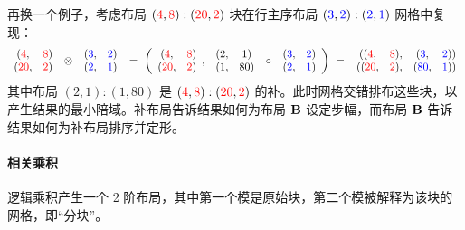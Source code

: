 再换一个例子，考虑布局 $(\textcolor{red}{4},\textcolor{red}{8}):(\textcolor{red}{20},\textcolor{red}{2})$ 块在行主序布局 $(\textcolor{blue}{3},\textcolor{blue}{2}):(\textcolor{blue}{2},\textcolor{blue}{1})$ 网格中复现：
\begin{align*}
\begin{array}{cc} (\textcolor{red}{4}, & \textcolor{red}{8}) \\ (\textcolor{red}{20}, & \textcolor{red}{2}) \end{array}
\ \otimes \
\begin{array}{cc} (\textcolor{blue}{3}, & \textcolor{blue}{2}) \\ (\textcolor{blue}{2}, & \textcolor{blue}{1}) \end{array}
\ = \
\left(
\begin{array}{cc} (\textcolor{red}{4}, & \textcolor{red}{8}) \\ (\textcolor{red}{20}, & \textcolor{red}{2}) \end{array}, \
\begin{array}{cc} (2, & 1) \\ (1, & 80) \end{array}
\ \circ \
\begin{array}{cc} (\textcolor{blue}{3}, & \textcolor{blue}{2}) \\ (\textcolor{blue}{2}, & \textcolor{blue}{1}) \end{array}
\right)
\ = \
\begin{array}{cccc}((\textcolor{red}{4}, & \textcolor{red}{8}), & (\textcolor{blue}{3}, & \textcolor{blue}{2})) \\ ((\textcolor{red}{20}, & \textcolor{red}{2}), & (\textcolor{blue}{80}, & \textcolor{blue}{1})) \end{array}
\end{align*}
其中布局 $(2,1):(1,80)$ 是 $(\textcolor{red}{4},\textcolor{red}{8}):(\textcolor{red}{20},\textcolor{red}{2})$ 的补。此时网格交错排布这些块，以产生结果的最小陪域。补布局告诉结果如何为布局 $\mathbf{B}$ 设定步幅，而布局 $\mathbf{B}$ 告诉结果如何为补布局排序并定形。

\paragraph{相关乘积}

逻辑乘积产生一个 2 阶布局，其中第一个模是原始块，第二个模被解释为该块的网格，即“分块”。


